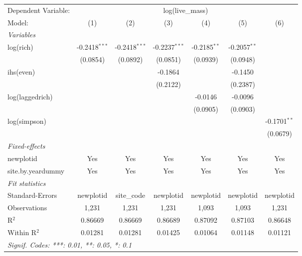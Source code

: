 \begin{tabular}{lcccccc}
\tabularnewline\midrule\midrule
Dependent Variable:&\multicolumn{6}{c}{log(live\_mass)}\\
Model:&(1) & (2) & (3) & (4) & (5) & (6)\\
\midrule \emph{Variables}&   &   &   &   &   &  \\
log(rich)&-0.2418$^{***}$ & -0.2418$^{***}$ & -0.2237$^{***}$ & -0.2185$^{**}$ & -0.2057$^{**}$ &   \\
  &(0.0854) & (0.0892) & (0.0851) & (0.0939) & (0.0948) &   \\
ihs(even)&   &    & -0.1864 &    & -0.1450 &   \\
  &   &    & (0.2122) &    & (0.2387) &   \\
log(laggedrich)&   &    &    & -0.0146 & -0.0096 &   \\
  &   &    &    & (0.0905) & (0.0903) &   \\
log(simpson)&   &    &    &    &    & -0.1701$^{**}$\\
  &   &    &    &    &    & (0.0679)\\
\midrule \emph{Fixed-effects}&   &   &   &   &   &  \\
newplotid & Yes & Yes & Yes & Yes & Yes & Yes\\
site.by.yeardummy & Yes & Yes & Yes & Yes & Yes & Yes\\
\midrule \emph{Fit statistics}&  & & & & & \\
Standard-Errors& newplotid&site\_code&newplotid&newplotid&newplotid&newplotid\\
Observations & 1,231&1,231&1,231&1,093&1,093&1,231\\
R$^2$ & 0.86669&0.86669&0.86689&0.87092&0.87103&0.86648\\
Within R$^2$ & 0.01281&0.01281&0.01425&0.01064&0.01148&0.01121\\
\midrule\midrule\multicolumn{7}{l}{\emph{Signif. Codes: ***: 0.01, **: 0.05, *: 0.1}}\\
\end{tabular}


